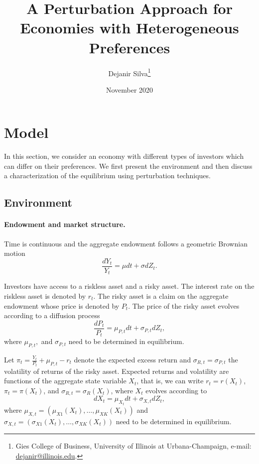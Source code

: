 \documentclass[11pt,english]{article}
\title{\textbf{A Perturbation Approach for Economies with Heterogeneous Preferences}}
\author{ Dejanir Silva\thanks{Gies College of Business, University of Illinois at Urbana-Champaign, e-mail: \href{dejanir@illinois.edu}{dejanir@illinois.edu}.}}
\date{November 2020}
\begin{document}
	\maketitle
\onehalfspacing	


\section{Model}

In this section, we consider an economy with different types of investors which can differ on their preferences. We first present the environment and then discuss a characterization of the equilibrium using perturbation techniques.

\subsection{Environment}

\paragraph{Endowment and market structure.} Time is continuous and the aggregate endowment follows a geometric Brownian motion
\begin{equation*}
    \frac{d Y_t}{Y_t} = \mu dt + \sigma d Z_t.
\end{equation*}

Investors have access to a riskless asset and a risky asset. The interest rate on the riskless asset is denoted by $r_t$. The risky asset is a claim on the aggregate endowment whose price is denoted by $P_t$. The price of the risky asset evolves according to a diffusion process
\begin{equation}
    \frac{d P_t}{P_t} = \mu_{P,t} dt + \sigma_{P,t} d Z_t,
\end{equation}
where $\mu_{P,t},$ and $\sigma_{P,t}$ need to be determined in equilibrium.

Let $\pi_t = \frac{Y_t}{P_t} + \mu_{P,t}- r_t$ denote the expected excess return and $\sigma_{R,t} = \sigma_{P,t}$ the volatility of returns of the risky asset. Expected returns and volatility are functions of the aggregate state variable $X_t$, that is, we can write $r_t = r(X_t)$, $\pi_t = \pi(X_t)$, and $\sigma_{R,t} = \sigma_R(X_t)$, where $X_t$ evolves according to
\begin{equation*}
    d X_t = \mu_{X_t} dt + \sigma_{X,t} d Z_t,
\end{equation*}
where $\mu_{X,t} = (\mu_{X1}(X_t), \ldots, \mu_{XK}(X_t))$ and $\sigma_{X,t} = (\sigma_{X1}(X_t), \ldots, \sigma_{XK}(X_t))$ need to be determined in equilibrium.
\end{document}
